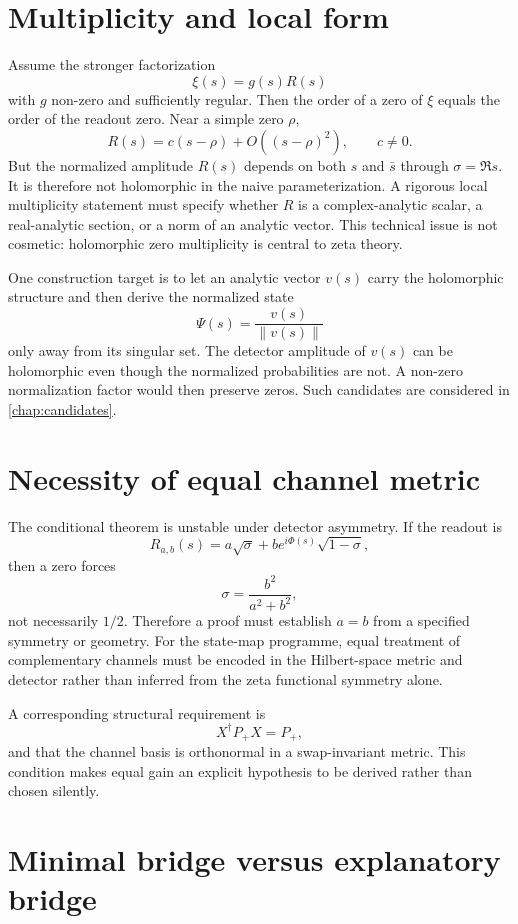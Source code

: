 \section{Multiplicity and local form}

Assume the stronger factorization
\[
 \xi(s)=g(s)R(s)
\]
with $g$ non-zero and sufficiently regular. Then the order of a zero of $\xi$ equals the order of the readout zero. Near a simple zero $\rho$,
\[
 R(s)=c(s-\rho)+O((s-\rho)^2),\qquad c\neq0.
\]
But the normalized amplitude $R(s)$ depends on both $s$ and $\bar s$ through $\sigma=\Re s$. It is therefore not holomorphic in the naive parameterization. A rigorous local multiplicity statement must specify whether $R$ is a complex-analytic scalar, a real-analytic section, or a norm of an analytic vector. This technical issue is not cosmetic: holomorphic zero multiplicity is central to zeta theory.

One construction target is to let an analytic vector $v(s)$ carry the holomorphic structure and then derive the normalized state
\[
 \Psi(s)=\frac{v(s)}{\|v(s)\|}
\]
only away from its singular set. The detector amplitude of $v(s)$ can be holomorphic even though the normalized probabilities are not. A non-zero normalization factor would then preserve zeros. Such candidates are considered in \cref{chap:candidates}.

\section{Necessity of equal channel metric}

The conditional theorem is unstable under detector asymmetry. If the readout is
\[
 R_{a,b}(s)=a\sqrt\sigma+b e^{i\Phi(s)}\sqrt{1-\sigma},
\]
then a zero forces
\[
 \sigma=\frac{b^2}{a^2+b^2},
\]
not necessarily $1/2$. Therefore a proof must establish $a=b$ from a specified symmetry or geometry. For the state-map programme, equal treatment of complementary channels must be encoded in the Hilbert-space metric and detector rather than inferred from the zeta functional symmetry alone.

A corresponding structural requirement is
\begin{equation}
 X^\dagger P_+X=P_+,
 \label{eq:detector-swap-invariance}
\end{equation}
and that the channel basis is orthonormal in a swap-invariant metric. This condition makes equal gain an explicit hypothesis to be derived rather than chosen silently.

\section{Minimal bridge versus explanatory bridge}

